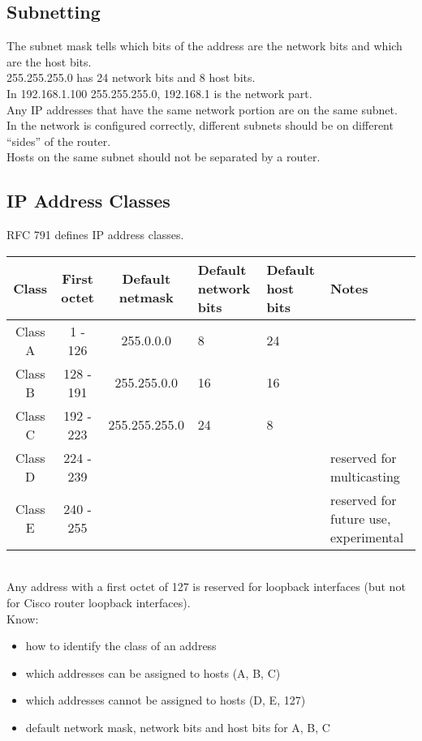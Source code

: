 \subsection{Subnetting}

The subnet mask tells which bits of the address are the network bits and
which are the host bits.\\

255.255.255.0 has 24 network bits and 8 host bits.\\

In 192.168.1.100 255.255.255.0, 192.168.1 is the network part.\\

Any IP addresses that have the same network portion are on the same subnet.\\

In the network is configured correctly, different subnets should be on different
``sides'' of the router.\\

Hosts on the same subnet should not be separated by a router.

\subsection{IP Address Classes}

RFC 791 defines IP address classes.

\begin{tabular}{ | c | c | c | p{1cm} | p{1cm} | p{4cm} | }
\hline
Class & First octet & Default netmask & Default network bits & Default host bits & Notes \\ \hline
Class A & 1 - 126 & 255.0.0.0 & 8 & 24 & \\ \hline
Class B & 128 - 191 & 255.255.0.0 & 16 & 16 & \\ \hline
Class C & 192 - 223 & 255.255.255.0 & 24 & 8 & \\ \hline
Class D & 224 - 239 & & & & reserved for multicasting \\ \hline
Class E & 240 - 255 & & & & reserved for future use, experimental \\ \hline
\end{tabular}\\

Any address with a first octet of 127 is reserved for loopback interfaces
(but not for Cisco router loopback interfaces).\\

Know:

\begin{itemize}

\item how to identify the class of an address
\item which addresses can be assigned to hosts (A, B, C)
\item which addresses cannot be assigned to hosts (D, E, 127)
\item default network mask, network bits and host bits for A, B, C

\end{itemize}

